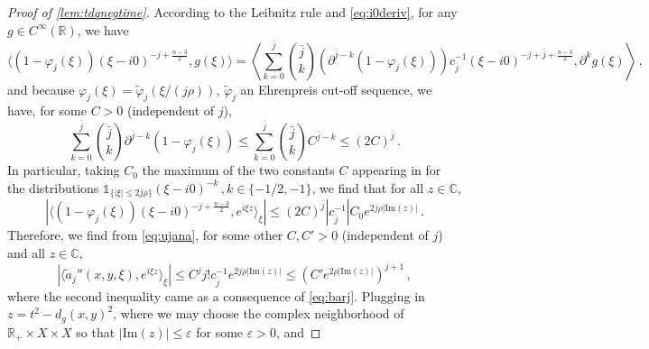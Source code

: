 \documentclass[
	fontsize=11pt, 
	twoside=false, 
	abstract=true, 
	a4paper,
]{scrartcl}
\newcommand{\eps}{\varepsilon}
\newcommand{\RR}{\mathbb{R}}
\newcommand{\CC}{\mathbb{C}}
\newcommand{\dd}{\mathrm{d}}
\newcommand{\abs}[1]{\left\lvert#1\right\rvert}
\newcommand{\del}{\partial}
\newcommand{\td}[1]{\tilde{#1}}
\begin{document}
\begin{proof}[Proof of \cref{lem:tdqnegtime}]
		According to the Leibnitz rule and \cref{eq:i0deriv}, for any $g\in C^\infty(\RR)$, we have
		\[
			\langle (1-\varphi_j(\xi)) (\xi-i0)^{-j+\frac{n-3}{2}}, g(\xi)\rangle = \left\langle \sum_{k=0}^{\bar j} {\bar j\choose k}\left(\del^{\bar j-k}(1-\varphi_j(\xi))\right) c_{\bar j}^{-1} (\xi-i0)^{-j+\bar j + \frac{n-3}{2}}, \del^k g(\xi)\right\rangle\,,
		\]
		and because $\varphi_j(\xi) = \td{\varphi}_j(\xi/(j\rho))$, $\td{\varphi}_j$ an Ehrenpreis cut-off sequence, we have, for some $C>0$ (independent of $j$),
		\[
			\sum_{k=0}^{\bar j} {\bar j\choose k}\del^{\bar j-k}(1-\varphi_j(\xi)) \leq \sum_{k=0}^{\bar j} {\bar j\choose k} C^{\bar j-k} \leq (2C)^{\bar j}\,.
		\]
		In particular, taking $C_0$ the maximum of the two constants $C$ appearing in \cite[Eq.~(7.3.2)]{hoermander1} for the distributions $\mathbb{1}_{\{\abs{\xi}\leq 2j\rho\}}(\xi-i0)^{-k}\,, k\in \{-1/2,-1\}$, we find that for all $z\in \CC$,
		\[
		\abs{\langle (1-\varphi_j(\xi)) (\xi-i0)^{-j+\frac{n-3}{2}}, e^{i\xi z}\rangle_\xi} \leq (2C)^{\bar j}\abs{c_{\bar j}^{-1}} C_0 e^{2j\rho \abs{\mathrm{Im}(z)}}\,.
		\]
		Therefore, we find from \cref{eq:ujana}, for some other $C,C'>0$ (independent of $j$) and all $z\in\mathbb{C}$,
		\[
			\abs{\langle \td{a}_j''(x,y,\xi), e^{i\xi z}\rangle_\xi} \leq C^{j} j! c_{\bar j}^{-1} e^{2j\rho\abs{\mathrm{Im}(z)}} \leq \left(C' e^{2\rho\abs{\mathrm{Im}(z)}}\right)^{j+1}\,,
		\]
		where the second inequality came as a consequence of \cref{eq:barj}. Plugging in $z = t^2-d_g(x,y)^2$, where we may choose the complex neighborhood of $\RR_+\times X\times X$ so that $\abs{\mathrm{Im}(z)}\leq \eps$ for some $\eps>0$, and %
%
%
%		

\end{proof}
\end{document}
